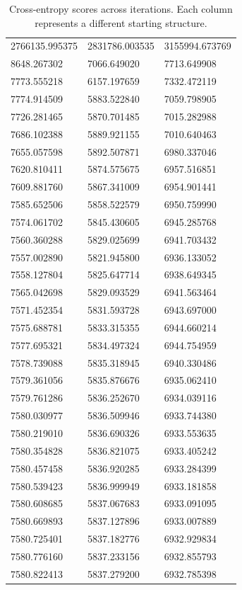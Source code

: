 \begin{table}\begin{tabular}{|l|l|l|}
\hline
2766135.995375&2831786.003535&3155994.673769\\
8648.267302&7066.649020&7713.649908\\
7773.555218&6157.197659&7332.472119\\
7774.914509&5883.522840&7059.798905\\
7726.281465&5870.701485&7015.282988\\
7686.102388&5889.921155&7010.640463\\
7655.057598&5892.507871&6980.337046\\
7620.810411&5874.575675&6957.516851\\
7609.881760&5867.341009&6954.901441\\
7585.652506&5858.522579&6950.759990\\
7574.061702&5845.430605&6945.285768\\
7560.360288&5829.025699&6941.703432\\
7557.002890&5821.945800&6936.133052\\
7558.127804&5825.647714&6938.649345\\
7565.042698&5829.093529&6941.563464\\
7571.452354&5831.593728&6943.697000\\
7575.688781&5833.315355&6944.660214\\
7577.695321&5834.497324&6944.754959\\
7578.739088&5835.318945&6940.330486\\
7579.361056&5835.876676&6935.062410\\
7579.761286&5836.252670&6934.039116\\
7580.030977&5836.509946&6933.744380\\
7580.219010&5836.690326&6933.553635\\
7580.354828&5836.821075&6933.405242\\
7580.457458&5836.920285&6933.284399\\
7580.539423&5836.999949&6933.181858\\
7580.608685&5837.067683&6933.091095\\
7580.669893&5837.127896&6933.007889\\
7580.725401&5837.182776&6932.929834\\
7580.776160&5837.233156&6932.855793\\
7580.822413&5837.279200&6932.785398\\
\hline
\end{tabular}\caption{
  Cross-entropy scores across iterations. Each column represents a different starting structure.}\end{table}

